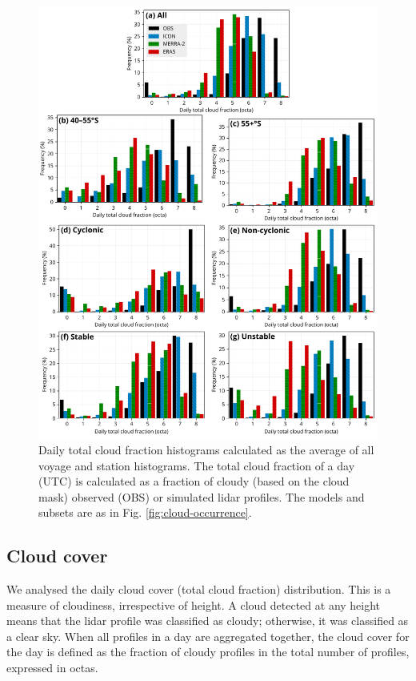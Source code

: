 \documentclass[12pt,a4paper]{article}
\begin{document}
\begin{figure}
\centering
\includegraphics[width=\textwidth]{img/clt_hist.pdf}
\caption{
Daily total cloud fraction histograms calculated as the average of all voyage
and station histograms. The total cloud fraction of a day (UTC) is calculated
as a fraction of cloudy (based on the cloud mask) observed (OBS) or simulated
lidar profiles. The models and subsets are as in Fig.
\ref{fig:cloud-occurrence}.
}
\label{fig:cloud-cover}
\end{figure}

\subsection{Cloud cover}

We analysed the daily cloud cover (total cloud fraction) distribution. This is
a measure of cloudiness, irrespective of height. A cloud detected at any height
means that the lidar profile was classified as cloudy; otherwise, it was
classified as a clear sky. When all profiles in a day are aggregated together,
the cloud cover for the day is defined as the fraction of cloudy profiles in
the total number of profiles, expressed in octas.
\end{document}
